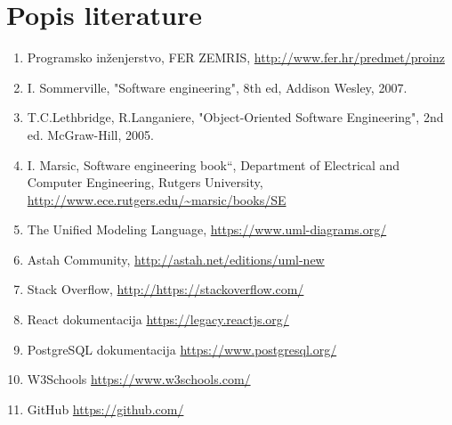 \chapter*{Popis literature}
	 	
		
		\begin{enumerate}
			
			
			\item  Programsko inženjerstvo, FER ZEMRIS, \url{http://www.fer.hr/predmet/proinz}
			
			\item  I. Sommerville, "Software engineering", 8th ed, Addison Wesley, 2007.
			
			\item  T.C.Lethbridge, R.Langaniere, "Object-Oriented Software Engineering", 2nd ed. McGraw-Hill, 2005.
			
			\item  I. Marsic, Software engineering book``, Department of Electrical and Computer Engineering, Rutgers University, \url{http://www.ece.rutgers.edu/~marsic/books/SE}
			
			\item  The Unified Modeling Language, \url{https://www.uml-diagrams.org/}
			
			\item Astah Community, \url{http://astah.net/editions/uml-new}
			
			\item Stack Overflow, \url{http://https://stackoverflow.com/}
			
			\item React dokumentacija \url{https://legacy.reactjs.org/}
			
			\item PostgreSQL dokumentacija \url{https://www.postgresql.org/}
			 
			\item W3Schools \url{https://www.w3schools.com/}
			
			\item GitHub	\url{https://github.com/}
			
			
		\end{enumerate}
		
		 